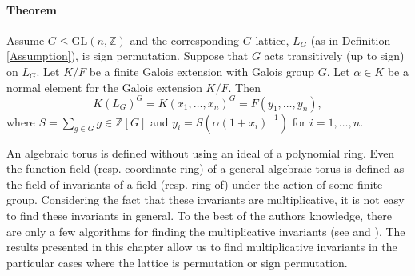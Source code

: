 \documentclass[12pt]{article}
\theoremstyle{plain}
\newcommand{\Z}{\ensuremath{\mathbb{Z}}}
\begin{document}







 



\paragraph{Theorem}
Assume $G \leq \mathrm{GL}(n,\Z)$ and the corresponding $G$-lattice,
$L_G$ (as in Definition \ref{Assumption}), is sign
permutation. Suppose that $G$ acts transitively (up to sign) on
$L_G$. Let $K/F$ be a finite Galois extension with Galois group
$G$. Let $\alpha \in K$ be a normal element for the Galois extension
$K/F$. Then
$$K(L_G)^G = K(x_1,\ldots, x_n)^G = F(y_1, \ldots, y_{n}),$$ where $S
= \sum_{g \in G} g \in \Z[G]$ and $y_i = S(\alpha (1+x_i)^{-1})$ for $
i = 1, \ldots, n$.

An algebraic torus is defined without using an ideal of a polynomial
ring. Even the function field (resp. coordinate ring) of a general
algebraic torus is defined as the field of invariants of a field
(resp. ring of) under the action of some finite group. Considering the
fact that these invariants are multiplicative, it is not easy to find
these invariants in general. To the best of the authors knowledge,
there are only a few algorithms for finding the multiplicative
invariants (see \cite{Kemper} and \cite{Lorenz}). The results
presented in this chapter allow us to find multiplicative invariants
in the particular cases where the lattice is permutation or sign
permutation.
\end{document}
